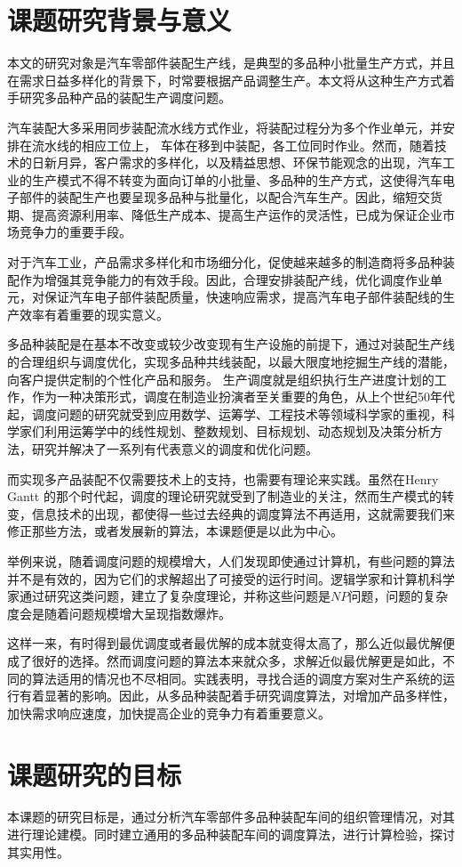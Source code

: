 \chapter{课题研究背景与意义}
本文的研究对象是汽车零部件装配生产线，是典型的多品种小批量生产方式，并且在需求日益多样化的背景下，时常要根据产品调整生产。本文将从这种生产方式着手研究多品种产品的装配生产调度问题。

汽车装配大多采用同步装配流水线方式作业，将装配过程分为多个作业单元，并安排在流水线的相应工位上，
车体在移到中装配，各工位同时作业。然而，随着技术的日新月异，客户需求的多样化，以及精益思想、环保节能观念的出现，汽车工业的生产模式不得不转变为面向订单的小批量、多品种的生产方式，这使得汽车电子部件的装配生产也要呈现多品种与批量化，以配合汽车生产。因此，缩短交货期、提高资源利用率、降低生产成本、提高生产运作的灵活性，已成为保证企业市场竞争力的重要手段。

对于汽车工业，产品需求多样化和市场细分化，促使越来越多的制造商将多品种装配作为增强其竞争能力的有效手段。因此，合理安排装配产线，优化调度作业单元，对保证汽车电子部件装配质量，快速响应需求，提高汽车电子部件装配线的生产效率有着重要的现实意义。

多品种装配是在基本不改变或较少改变现有生产设施的前提下，通过对装配生产线的合理组织与调度优化，实现多品种共线装配，以最大限度地挖掘生产线的潜能，向客户提供定制的个性化产品和服务。
生产调度就是组织执行生产进度计划的工作，作为一种决策形式，调度在制造业扮演者至关重要的角色，从上个世纪50年代起，调度问题的研究就受到应用数学、运筹学、工程技术等领域科学家的重视，科学家们利用运筹学中的线性规划、整数规划、目标规划、动态规划及决策分析方法，研究并解决了一系列有代表意义的调度和优化问题\cite{徐俊刚2004}。

而实现多产品装配不仅需要技术上的支持，也需要有理论来实践。虽然在Henry Gantt 的那个时代起，调度的理论研究就受到了制造业的关注，然而生产模式的转变，信息技术的出现，都使得一些过去经典的调度算法不再适用，这就需要我们来修正那些方法，或者发展新的算法，本课题便是以此为中心。

举例来说，随着调度问题的规模增大，人们发现即使通过计算机，有些问题的算法并不是有效的，因为它们的求解超出了可接受的运行时间。逻辑学家和计算机科学家通过研究这类问题，建立了复杂度理论，并称这些问题是$NP$问题，问题的复杂度会是随着问题规模增大呈现指数爆炸。

这样一来，有时得到最优调度或者最优解的成本就变得太高了，那么近似最优解便成了很好的选择。然而调度问题的算法本来就众多，求解近似最优解更是如此，不同的算法适用的情况也不尽相同。实践表明，寻找合适的调度方案对生产系统的运行有着显著的影响。因此，从多品种装配着手研究调度算法，对增加产品多样性，加快需求响应速度，加快提高企业的竞争力有着重要意义。

\chapter{课题研究的目标}
本课题的研究目标是，通过分析汽车零部件多品种装配车间的组织管理情况，对其进行理论建模。同时建立通用的多品种装配车间的调度算法，进行计算检验，探讨其实用性。
